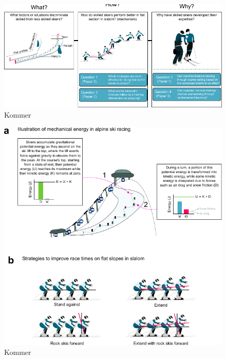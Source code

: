 \documentclass{report}
\begin{document}
\begin{figure}[H]
\centering
\includegraphics{figure_overview_2.pdf}
\caption{Kommer}
\label{fig:energy}
\end{figure}




\begin{figure}[H]
\centering
\includegraphics{figure_energymechanics.pdf}
\caption{Kommer}
\label{fig:energy}
\end{figure}
\end{document}
